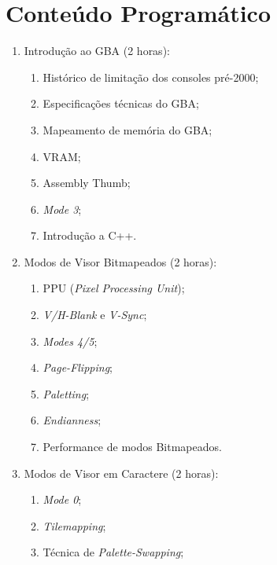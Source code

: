 \documentclass{article}
\begin{document}
\section{Conteúdo Programático}

\begin{enumerate}
    \item Introdução ao GBA (2 horas):
        \begin{samepage}
        \begin{enumerate}
                \item Histórico de limitação dos consoles pré-2000;
                \item Especificações técnicas do GBA;
                \item Mapeamento de memória do GBA;
                \item VRAM;
                \item Assembly Thumb;
                \item \textit{Mode 3};
                \item Introdução a C++.
        \end{enumerate}
        \end{samepage}
    \item Modos de Visor Bitmapeados (2 horas):
        \begin{samepage}
        \begin{enumerate}
                \item PPU (\textit{Pixel Processing Unit});
                \item \textit{V/H-Blank} e \textit{V-Sync};
                \item \textit{Modes 4/5};
                \item \textit{Page-Flipping};
                \item \textit{Paletting};
                \item \textit{Endianness};
                \item Performance de modos Bitmapeados.
        \end{enumerate}
        \end{samepage}
    \item Modos de Visor em Caractere (2 horas):
        \begin{samepage}
        \begin{enumerate}
                \item \textit{Mode 0};
                \item \textit{Tilemapping};
                \item Técnica de \textit{Palette-Swapping};

\end{enumerate}
\end{samepage}
\end{enumerate}
\end{document}
